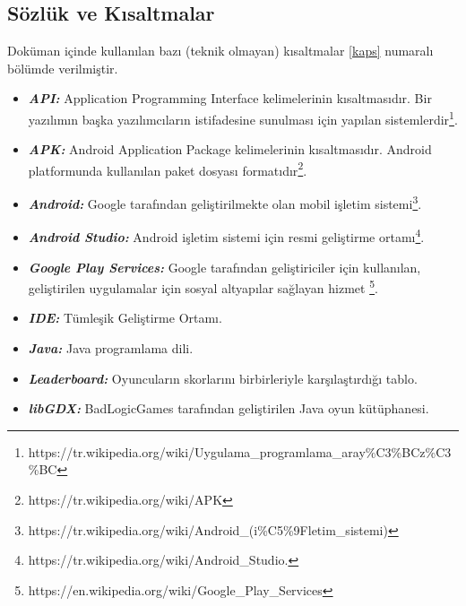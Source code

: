 \documentclass[12pt,a4paper]{article}
\begin{document}
   \subsection{Sözlük ve Kısaltmalar}
   Doküman içinde kullanılan bazı (teknik olmayan) kısaltmalar \ref{kaps} numaralı bölümde verilmiştir.
   \begin{itemize}
      \item \textbf{\textit{API:}} Application Programming Interface kelimelerinin kısaltmasıdır. Bir yazılımın başka yazılımcıların istifadesine sunulması için yapılan sistemlerdir\footnote{https://tr.wikipedia.org/wiki/Uygulama\_programlama\_aray\%C3\%BCz\%C3\%BC}.
      \item \textbf{\textit{APK:}} Android Application Package kelimelerinin kısaltmasıdır. Android platformunda kullanılan paket dosyası formatıdır\footnote{https://tr.wikipedia.org/wiki/APK}.
      \item \textbf{\textit{Android:}} Google tarafından geliştirilmekte olan mobil işletim sistemi\footnote{https://tr.wikipedia.org/wiki/Android\_(i\%C5\%9Fletim\_sistemi)}.
      \item \textbf{\textit{Android Studio:}} Android işletim sistemi için resmi geliştirme ortamı\footnote{https://tr.wikipedia.org/wiki/Android\_Studio.}.
      \item \textbf{\textit{Google Play Services:}} Google tarafından geliştiriciler için kullanılan, geliştirilen uygulamalar için sosyal altyapılar sağlayan hizmet \footnote{https://en.wikipedia.org/wiki/Google\_Play\_Services}.
      \item \textbf{\textit{IDE:}} Tümleşik Geliştirme Ortamı.
      \item \textbf{\textit{Java:}} Java programlama dili.
      \item \textbf{\textit{Leaderboard:}} Oyuncuların skorlarını birbirleriyle karşılaştırdığı tablo.
      \item \textbf{\textit{libGDX:}} BadLogicGames tarafından geliştirilen Java oyun kütüphanesi.
   \end{itemize}

   \newpage
   \appendix
\end{document}

